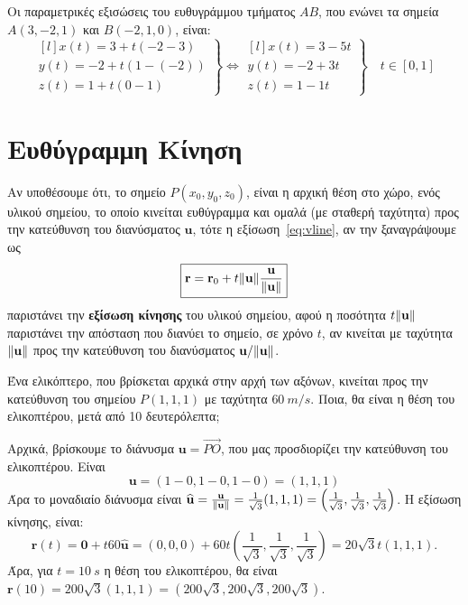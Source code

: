 \begin{example}
  Οι παραμετρικές εξισώσεις του ευθυγράμμου τμήματος $ AB $, που ενώνει τα σημεία 
  $ A(3,-2,1) $ και $ B(-2,1,0) $, είναι:
   \[
    \left.
      \begin{matrix*}[l]
        x(t) = 3+t(-2-3) \\
        y(t) = -2+t(1-(-2)) \\
        z(t) = 1+t(0-1)
      \end{matrix*} 
    \right\} \Leftrightarrow 
    \left.
      \begin{matrix*}[l]
        x(t) = 3-5t \\
        y(t) = -2+3t \\
        z(t) = 1-1t
      \end{matrix*} 
    \right\} \quad t \in [0,1]
   \] 
\end{example}


\section*{Ευθύγραμμη Κίνηση}

Αν υποθέσουμε ότι, το σημείο $ P(x_{0}, y_{0}, z_{0}) $, είναι η αρχική θέση στο 
χώρο, ενός υλικού σημείου, το οποίο κινείται ευθύγραμμα και ομαλά (με σταθερή ταχύτητα) 
προς την κατεύθυνση του διανύσματος $ \mathbf{u} $, τότε η εξίσωση~\eqref{eq:vline}, 
αν την ξαναγράψουμε ως
\[
  \boxed{\mathbf{r} = \mathbf{r}_{0} + t \norm{\mathbf{u}}
  \frac{\mathbf{u}}{\norm{\mathbf{u}}}}
\]
παριστάνει την \textbf{εξίσωση κίνησης} του υλικού σημείου, αφού η ποσότητα 
$ t \norm{\mathbf{u}} $ παριστάνει την απόσταση που διανύει το σημείο, σε χρόνο $t$, 
αν κινείται με ταχύτητα $ \norm{\mathbf{u}} $ προς την κατεύθυνση του διανύσματος 
$ \mathbf{u}/ \norm{\mathbf{u}} $.

\begin{example}
  Ένα ελικόπτερο, που βρίσκεται αρχικά στην αρχή των αξόνων, κινείται προς την
  κατεύθυνση του σημείου $P(1,1,1) $ με ταχύτητα $ \SI{60}{m/s} $. Ποια, θα είναι 
  η θέση του ελικοπτέρου, μετά από 10 δευτερόλεπτα;
\end{example}
\begin{solution}
  Αρχικά, βρίσκουμε το διάνυσμα $ \mathbf{u} = \vec{PO} $, που μας προσδιορίζει την
  κατεύθυνση του ελικοπτέρου. Είναι
  \[ \mathbf{u} = (1-0,1-0,1-0) = (1,1,1) \]
  Άρα το μοναδιαίο διάνυσμα είναι $ \mathbf{\widehat{u}} =
  \frac{\mathbf{u}}{\norm{\mathbf{u}}} = \frac{1}{\sqrt{3}} (1,1,1) =
  \left(\frac{1}{\sqrt{3}} , \frac{1}{\sqrt{3}} , \frac{1}{\sqrt{3}}\right) $. Η εξίσωση
  κίνησης, είναι:
  \[
    \mathbf{r}(t) = \mathbf{0} + t 60 \mathbf{\widehat{u}} = (0,0,0) + 60t 
    \left(\frac{1}{\sqrt{3}} , \frac{1}{\sqrt{3}} , \frac{1}{\sqrt{3}}\right) = 
    20 \sqrt{3} t (1,1,1).
  \] 
  Άρα, για $ t= \SI{10}{s} $ η θέση του ελικοπτέρου, θα είναι $ \mathbf{r}(10) = 200
  \sqrt{3} (1,1,1) = (200 \sqrt{3} , 200 \sqrt{3} , 200 \sqrt{3}) $. 
\end{solution}


